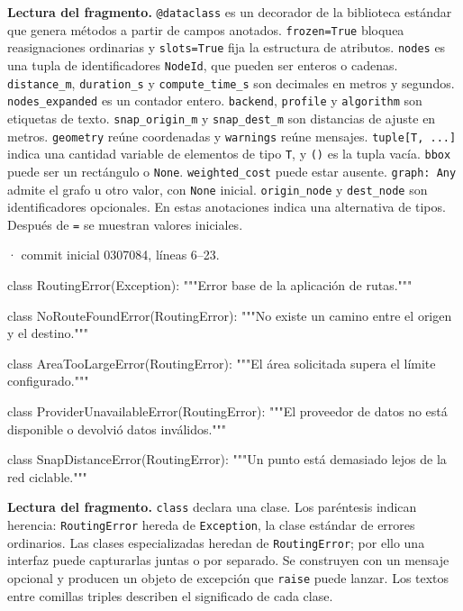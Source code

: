 \documentclass[11pt,a4paper]{article}
\begin{document}
\textbf{Lectura del fragmento.} \texttt{@dataclass} es un decorador de la biblioteca estándar que genera métodos a partir de campos anotados. \texttt{frozen=True} bloquea reasignaciones ordinarias y \texttt{slots=True} fija la estructura de atributos. \texttt{nodes} es una tupla de identificadores \texttt{NodeId}, que pueden ser enteros o cadenas. \texttt{distance\_m}, \texttt{duration\_s} y \texttt{compute\_time\_s} son decimales en metros y segundos. \texttt{nodes\_expanded} es un contador entero. \texttt{backend}, \texttt{profile} y \texttt{algorithm} son etiquetas de texto. \texttt{snap\_origin\_m} y \texttt{snap\_dest\_m} son distancias de ajuste en metros. \texttt{geometry} reúne coordenadas y \texttt{warnings} reúne mensajes. \texttt{tuple[T, ...]} indica una cantidad variable de elementos de tipo \texttt{T}, y \texttt{()} es la tupla vacía. \texttt{bbox} puede ser un rectángulo o \texttt{None}. \texttt{weighted\_cost} puede estar ausente. \texttt{graph: Any} admite el grafo u otro valor, con \texttt{None} inicial. \texttt{origin\_node} y \texttt{dest\_node} son identificadores opcionales. En estas anotaciones \texttt{\textbar{}} indica una alternativa de tipos. Después de \texttt{=} se muestran valores iniciales.


\smallskip
{\footnotesize\texttt{} · commit inicial 0307084, líneas 6--23.}\par
\begin{Codigo}[firstnumber=6]
class RoutingError(Exception):
    """Error base de la aplicación de rutas."""


class NoRouteFoundError(RoutingError):
    """No existe un camino entre el origen y el destino."""


class AreaTooLargeError(RoutingError):
    """El área solicitada supera el límite configurado."""


class ProviderUnavailableError(RoutingError):
    """El proveedor de datos no está disponible o devolvió datos inválidos."""


class SnapDistanceError(RoutingError):
    """Un punto está demasiado lejos de la red ciclable."""
\end{Codigo}

\textbf{Lectura del fragmento.} \texttt{class} declara una clase. Los paréntesis indican herencia: \texttt{RoutingError} hereda de \texttt{Exception}, la clase estándar de errores ordinarios. Las clases especializadas heredan de \texttt{RoutingError}; por ello una interfaz puede capturarlas juntas o por separado. Se construyen con un mensaje opcional y producen un objeto de excepción que \texttt{raise} puede lanzar. Los textos entre comillas triples describen el significado de cada clase.
\end{document}
